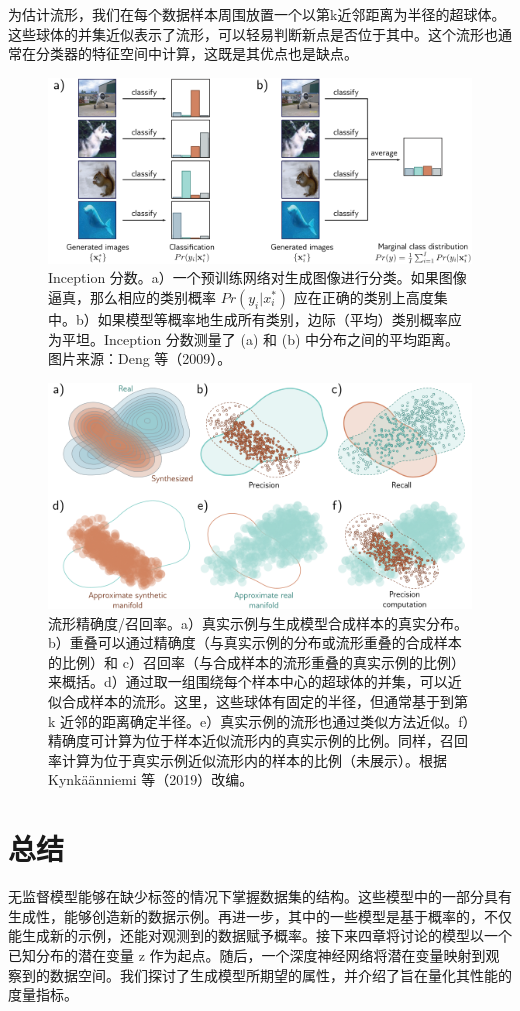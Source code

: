 为估计流形，我们在每个数据样本周围放置一个以第k近邻距离为半径的超球体。这些球体的并集近似表示了流形，可以轻易判断新点是否位于其中。这个流形也通常在分类器的特征空间中计算，这既是其优点也是缺点。

\begin{figure}[ht!]
\centering
\includegraphics[width=0.7\linewidth]{png/chapter14/UnsupInception.png}
\caption{Inception 分数。a）一个预训练网络对生成图像进行分类。如果图像逼真，那么相应的类别概率 \(Pr(y_i | x^*_i)\) 应在正确的类别上高度集中。b）如果模型等概率地生成所有类别，边际（平均）类别概率应为平坦。Inception 分数测量了 (a) 和 (b) 中分布之间的平均距离。图片来源：Deng 等（2009）。}
\end{figure}


\begin{figure}[ht!]
\centering
\includegraphics[width=0.7\linewidth]{png/chapter14/UnsupPrecisionRecall.png}
\caption{流形精确度/召回率。a）真实示例与生成模型合成样本的真实分布。b）重叠可以通过精确度（与真实示例的分布或流形重叠的合成样本的比例）和 c）召回率（与合成样本的流形重叠的真实示例的比例）来概括。d）通过取一组围绕每个样本中心的超球体的并集，可以近似合成样本的流形。这里，这些球体有固定的半径，但通常基于到第 k 近邻的距离确定半径。e）真实示例的流形也通过类似方法近似。f）精确度可计算为位于样本近似流形内的真实示例的比例。同样，召回率计算为位于真实示例近似流形内的样本的比例（未展示）。根据 Kynkäänniemi 等（2019）改编。}
\end{figure}

\section{总结}
无监督模型能够在缺少标签的情况下掌握数据集的结构。这些模型中的一部分具有生成性，能够创造新的数据示例。再进一步，其中的一些模型是基于概率的，不仅能生成新的示例，还能对观测到的数据赋予概率。接下来四章将讨论的模型以一个已知分布的潜在变量 z 作为起点。随后，一个深度神经网络将潜在变量映射到观察到的数据空间。我们探讨了生成模型所期望的属性，并介绍了旨在量化其性能的度量指标。

